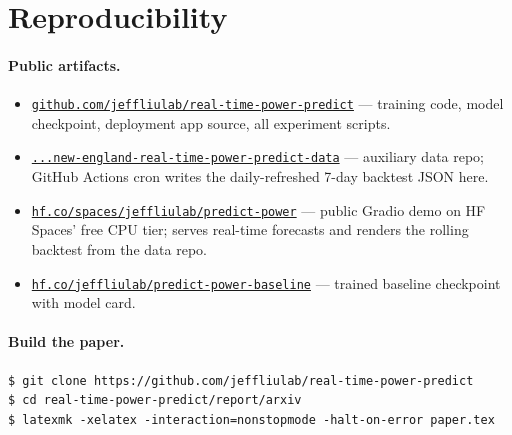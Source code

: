 
\section{Reproducibility}
\label{app:repro}

\paragraph{Public artifacts.}
\begin{itemize}\setlength\itemsep{1pt}
\item \href{https://github.com/jeffliulab/real-time-power-predict}{\texttt{github.com/jeffliulab/real-time-power-predict}}
   — training code, model checkpoint, deployment app source, all
   experiment scripts.
\item \href{https://github.com/jeffliulab/new-england-real-time-power-predict-data}{\texttt{...new-england-real-time-power-predict-data}}
   — auxiliary data repo; GitHub Actions cron writes the
   daily-refreshed 7-day backtest JSON here.
\item \href{https://huggingface.co/spaces/jeffliulab/predict-power}{\texttt{hf.co/spaces/jeffliulab/predict-power}}
   — public Gradio demo on HF Spaces' free CPU tier; serves real-time
   forecasts and renders the rolling backtest from the data repo.
\item \href{https://huggingface.co/jeffliulab/predict-power-baseline}{\texttt{hf.co/jeffliulab/predict-power-baseline}}
   — trained baseline checkpoint with model card.
\end{itemize}

\paragraph{Build the paper.}
\begin{lstlisting}[basicstyle=\ttfamily\footnotesize]
$ git clone https://github.com/jeffliulab/real-time-power-predict
$ cd real-time-power-predict/report/arxiv
$ latexmk -xelatex -interaction=nonstopmode -halt-on-error paper.tex
\end{lstlisting}

